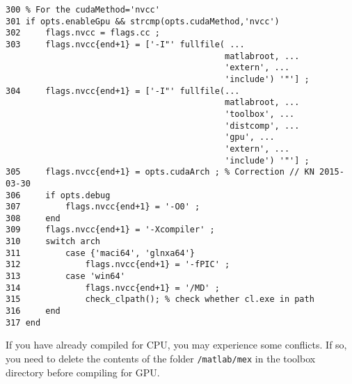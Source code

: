 \documentclass[Main]{subfiles}
\begin{document}
		\begin{lstlisting}[caption=Exerpt from \texttt{vl\_compilenn}, style=Code-Matlab, label=lst:vl_compilenn_exerpt]
300	% For the cudaMethod='nvcc'
301	if opts.enableGpu && strcmp(opts.cudaMethod,'nvcc')
302		flags.nvcc = flags.cc ;
303		flags.nvcc{end+1} = ['-I"' fullfile( ...
											matlabroot, ...
											'extern', ...
											'include') '"'] ;
304		flags.nvcc{end+1} = ['-I"' fullfile(...
											matlabroot, ...
											'toolbox', ...
											'distcomp', ...
											'gpu', ...
											'extern', ...
											'include') '"'] ;
305		flags.nvcc{end+1} = opts.cudaArch ; % Correction // KN 2015-03-30
306		if opts.debug
307			flags.nvcc{end+1} = '-O0' ;
308		end
309		flags.nvcc{end+1} = '-Xcompiler' ;
310		switch arch
311			case {'maci64', 'glnxa64'}
312				flags.nvcc{end+1} = '-fPIC' ;
313			case 'win64'
314				flags.nvcc{end+1} = '/MD' ;
315				check_clpath(); % check whether cl.exe in path
316		end
317	end
			\end{lstlisting}


		If you have already compiled for CPU, you may experience some conflicts.
		If so, you need to delete the contents of the folder \texttt{/matlab/mex} in the toolbox directory before compiling for GPU.


\end{document}
